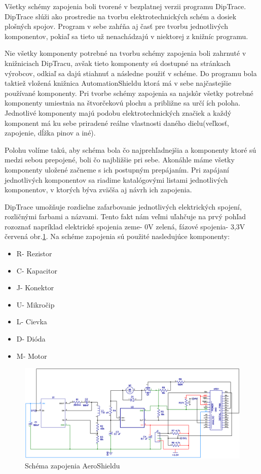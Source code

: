 Všetky schémy zapojenia boli tvorené v bezplatnej verzii programu DipTrace. DipTrace slúži ako prostredie na tvorbu elektrotechnických schém a dosiek plošných spojov. Program v sebe zahŕňa aj časť pre tvorbu jednotlivých komponentov, pokiaľ sa tieto už nenachádzajú v niektorej z knižníc programu.

Nie všetky komponenty potrebné na tvorbu schémy zapojenia boli zahrnuté v knižniciach DipTracu, avšak tieto komponenty sú dostupné na stránkach výrobcov, odkiaľ sa dajú stiahnuť a následne použiť v schéme\cite{AS5600Downl}\cite{TPS56339Downl}\cite{INAobr}. Do programu bola taktiež vložená knižnica AutomationShieldu ktorá má v sebe najčastejšie používané komponenty. Pri tvorbe schémy zapojenia sa najskôr všetky potrebné komponenty umiestnia na štvorčekovú plochu a približne sa určí ích poloha. Jednotlivé komponenty majú podobu elektrotechnických značiek a každý komponent má ku sebe priradené reálne vlastnosti daného dielu(veľkosť, zapojenie, dĺžka pinov a iné).

Polohu volíme takú, aby schéma bola čo najprehľadnejšia a komponenty ktoré sú medzi sebou prepojené, boli čo najbližšie pri sebe. Akonáhle máme všetky komponenty uložené začneme s ich postupným prepájaním. Pri zapájaní jednotlivých komponentov sa riadime katalógovými listami jednotlivých komponentov, v ktorých býva zväčša aj návrh ich zapojenia.

DipTrace umožňuje rozdielne zafarbovanie jednotlivých elektrických spojení, rozličnými farbami a názvami. Tento fakt nám veľmi uľahčuje na prvý pohľad rozoznať napríklad elektrické spojenia zeme- 0V zelená, fázové spojenia- 3,3V červená obr.\ref{OBRAZOK 2.3.5}. Na schéme zapojenia sú použité nasledujúce komponenty:
\begin{multicols}{3}
	\begin{itemize}
		\item R- Rezistor
		\item C- Kapacitor
		\item J- Konektor
		\item U- Mikročip
		\item L- Cievka
		\item D- Dióda
		\item M- Motor
	\end{itemize}
\end{multicols}


\begin{figure}[!tbh]
	\includegraphics[width=\textwidth]{obr/aeroSchema.png}
	\caption{Schéma zapojenia AeroShieldu}\label{OBRAZOK 2.3.5}
\end{figure}

